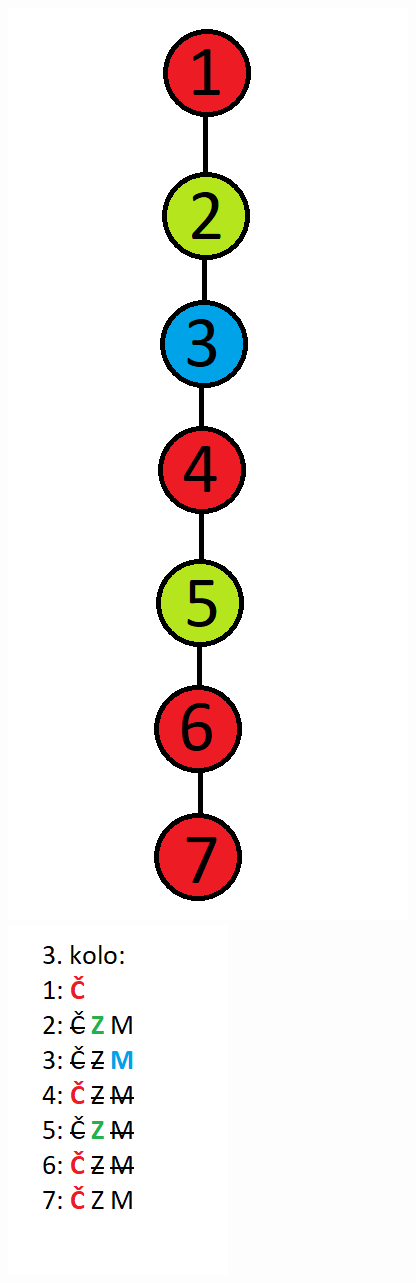 \documentclass[10pt,xcolor=pdflatex]{beamer}
\begin{document}
\begin{frame}
    \includegraphics[scale=0.3]{img/fc_tree.png}
    \includegraphics[scale=0.6]{img/fc_sets.png}
\end{frame}
\end{document}
